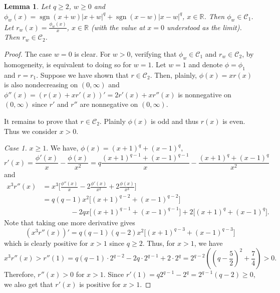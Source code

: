 \documentclass[10pt]{article}
\newcommand{\1}{\textbf{1}}
\newcommand{\R}{\mathbb{R}}
\DeclareMathOperator{\sgn}{sgn}
\newtheorem{lemma}[theorem]{Lemma}
\theoremstyle{remark}
\theoremstyle{definition}
\begin{document}
\begin{lemma}\label{lm:r-is-convex}
Let $q \geq 2$, $w \geq 0$ and $\phi_w(x) = \sgn(x+w)|x+w|^q + \sgn(x-w)|x-w|^q$, $x \in \R$. Then $\phi_w \in \mathcal{C}_1$. Let $r_w(x) = \frac{\phi_w(x)}{x}$, $x \in \R$ (with the value at $x=0$ understood as the limit). Then $r_w \in \mathcal{C}_2$.
\end{lemma}
\begin{proof}
The case $w=0$ is clear. For $w > 0$, verifying that $\phi_w \in \mathcal{C}_1$ and $r_w \in \mathcal{C}_2$, by homogeneity, is equivalent to doing so for $w=1$. Let $w=1$ and denote $\phi=\phi_1$ and $r=r_1$. Suppose we have shown that $r \in \mathcal{C}_2$. Then, plainly, $\phi(x) = xr(x)$ is also nondecreasing on $(0,\infty)$ and $\phi''(x) = (r(x) +xr'(x))' = 2r'(x) + xr''(x)$ is nonnegative on $(0,\infty)$ since $r'$ and $r''$ are nonnegative on $(0,\infty)$. 

It remains to prove that $r \in \mathcal{C}_2$. Plainly $\phi(x)$ is odd and thus $r(x)$ is even. Thus we consider $x > 0$.

\bigskip
\noindent
\emph{Case 1.} $x \geq 1$. We have, $\phi(x) = (x+1)^q + (x-1)^q$,
\[
r'(x) = \frac{\phi'(x)}{x} - \frac{\phi(x)}{x^2} = q\frac{(x+1)^{q-1}+(x-1)^{q-1}}{x} - \frac{(x+1)^q+(x-1)^q}{x^2}
\]
and
\begin{align*}
x^3r''(x) &= x^3\Bigg[\frac{\phi''(x)}{x}-2\frac{\phi'(x)}{x^2}+2\frac{\phi(x)}{x^3}\Bigg]\\
&=q(q-1)x^2\Big[(x+1)^{q-2}+(x-1)^{q-2}\Big] \\
&\qquad\qquad-2qx\Big[(x+1)^{q-1}+(x-1)^{q-1}\Big]+ 2\Big[(x+1)^q+(x-1)^q\Big].
\end{align*}
Note that taking one more derivative gives
\[
(x^3r''(x))' = q(q-1)(q-2)x^2\Big[(x+1)^{q-3}+(x-1)^{q-3}\Big]
\]
which is clearly positive for $x > 1$ since $q \geq 2$. Thus, for $x > 1$, we have
\[
x^3r''(x) > r''(1) = q(q-1)\cdot 2^{q-2}-2q\cdot 2^{q-1}+2\cdot 2^{q} = 2^{q-2}\left( \left(q-\frac{5}{2}\right)^2 + \frac{7}{4}\right) > 0.
\]
Therefore, $r''(x) > 0$ for $x > 1$. Since $r'(1) = q2^{q-1}-2^q = 2^{q-1}(q-2) \geq 0$, we also get that $r'(x)$ is positive for $x > 1$.




\end{proof}
\end{document}
